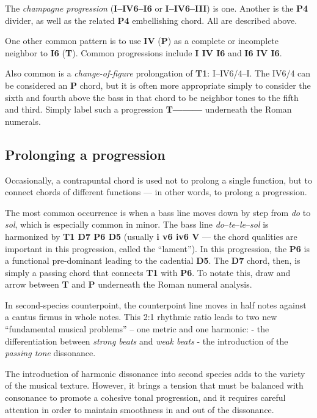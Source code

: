 \documentclass{book}
\begin{document}
The \emph{champagne progression} (\textbf{I--IV6--I6} or \textbf{I--IV6--III})
is one. Another is the \textbf{P4} divider, as well as the related \textbf{P4}
embellishing chord. All are described above.

One other common pattern is to use \textbf{IV} (\textbf{P}) as a complete or
incomplete neighbor to \textbf{I6} (\textbf{T}). Common progressions include
\textbf{I IV I6} and \textbf{I6 IV I6}.

Also common is a \emph{change-of-figure} prolongation of \textbf{T1}:
I--IV6/4--I. The IV6/4 can be considered an \textbf{P} chord, but it is often
more appropriate simply to consider the sixth and fourth above the bass in
that chord to be neighbor tones to the fifth and third. Simply label such a
progression \textbf{T---------} underneath the Roman numerals.

\hypertarget{prolonging-a-progression}{%
\subsection{Prolonging a progression}\label{prolonging-a-progression}}

Occasionally, a contrapuntal chord is used not to prolong a single function,
but to connect chords of different functions --- in other words, to prolong a
progression.

The most common occurrence is when a bass line moves down by step from
\emph{do} to \emph{sol}, which is especially common in minor. The bass line
\emph{do}--\emph{te}--\emph{le}--\emph{sol} is harmonized by \textbf{T1 D7 P6
D5} (usually \textbf{i v6 iv6 V} --- the chord qualities are important in this
progression, called the ``lament''). In this progression, the \textbf{P6} is a
functional pre-dominant leading to the cadential \textbf{D5}. The \textbf{D7}
chord, then, is simply a passing chord that connects \textbf{T1} with
\textbf{P6}. To notate this, draw and arrow between \textbf{T} and \textbf{P}
underneath the Roman numeral analysis.

In second-species counterpoint, the counterpoint line moves in half notes
against a cantus firmus in whole notes. This 2:1 rhythmic ratio leads to two
new ``fundamental musical problems'' -- one metric and one harmonic: - the
differentiation between \emph{strong beats} and \emph{weak beats} - the
introduction of the \emph{passing tone} dissonance.

The introduction of harmonic dissonance into second species adds to the
variety of the musical texture. However, it brings a tension that must be
balanced with consonance to promote a cohesive tonal progression, and it
requires careful attention in order to maintain smoothness in and out of the
dissonance.
\end{document}
